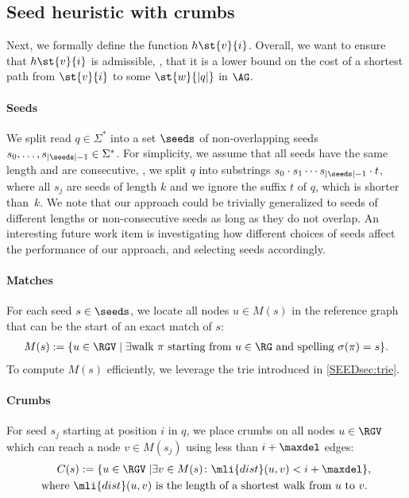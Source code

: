 \subsection{Seed heuristic with crumbs} \label{SEEDsec:definition}
%
Next, we formally define the \seedh function $h\st{v}{i}$. Overall, we want to
ensure that $h\st{v}{i}$ is admissible, \ie, that it is a lower bound on the
cost of a shortest path from $\st{v}{i}$ to some $\st{w}{|q|}$ in $\AG$.

\paragraph{Seeds}
%
We split read $q \in \Sigma^*$ into a set $\seeds$ of non-overlapping seeds
$s_0, \dots, s_{|\seeds|-1} \in \Sigma^*$.
%
For simplicity, we assume that all seeds have the same length and are
consecutive, \ie, we split $q$ into substrings $s_0 \cdot s_1 \cdots
s_{|\seeds|-1} \cdot t$, where all $s_j$ are seeds of length $k$ and we ignore
the suffix $t$ of $q$, which is shorter than~$k$.
%
We note that our approach could be trivially generalized to seeds of different
lengths or non-consecutive seeds as long as they do not overlap. An interesting
future work item is investigating how different choices of seeds affect the
performance of our approach, and selecting seeds accordingly.

\paragraph{Matches}
%
For each seed $s \in \seeds$, we locate all nodes $u \in M(s)$ in the reference
graph that can be the start of an exact match of $s$:
%
\begin{align*}
	M(s) := \{u \in \RGV \mid \exists \text{walk } \pi \text{ starting from } u \in \RG \text{ and spelling } \sigma(\pi) = s \}.
\end{align*}
%
To compute $M(s)$ efficiently, we leverage the trie introduced in
\cref{SEEDsec:trie}.

\paragraph{Crumbs}
For seed $s_j$ starting at position $i$ in $q$, we place crumbs on all nodes $u
\in \RGV$ which can reach a node $v \in M(s_j)$ using less than $i+\maxdel$
edges:
%
\begin{align*}
	C(s) := \{u \in \RGV \mid & \exists v \in M(s)\colon \mli{dist}(u, v) < i + \maxdel \},\\
	\text{where }\mli{dist}(u, v) &\text{ is the length of a shortest walk from } u \text{ to } v.
\end{align*}


